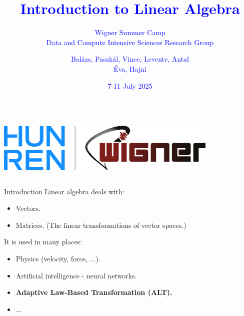 \documentclass{beamer}
\title{\textcolor{blue}{Introduction to Linear Algebra}}
\subtitle{\textcolor{blue}{Wigner Summer Camp \\ Data and Compute Intensive Sciences Research Group}}
\author{\textcolor{blue}{Balázs, Paszkál, Vince, Levente, Antal \\ Éva, Hajni}}
\date{\textcolor{blue}{7-11 July 2025}}
\begin{document}
\begin{frame}
  \titlepage
  \begin{columns}
    \centering
    \centering
    \includegraphics[width=0.8\textwidth]{../img/logo.png}
    \centering
  \end{columns}
\end{frame}

\begin{frame}{Introduction}
    Linear algebra deals with:
    \begin{itemize}
        \item Vectors.
        \item Matrices. (The linear transformations of vector spaces.)
    \end{itemize}

    It is used in many places:
    \begin{itemize}
        \item Physics (velocity, force, ...).
        \item Artificial intelligence - neural networks.
        \item \textbf{Adaptive Law-Based Transformation (ALT).} 
        \item ...
    \end{itemize}
\end{frame}
\end{document}
